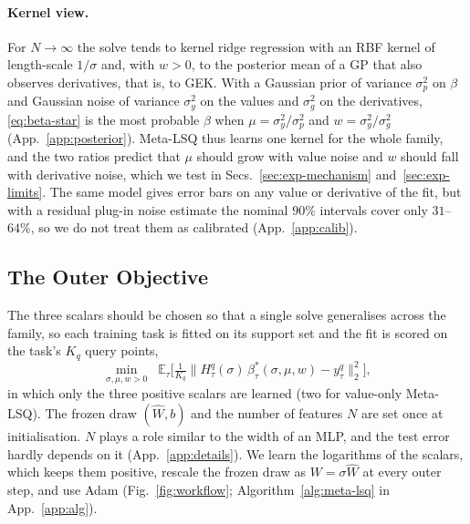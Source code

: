 \documentclass[fullpaper,final]{nldl}
\newcommand{\E}{\mathbb{E}}
\theoremstyle{plain}
\theoremstyle{definition}
\begin{document}
\paragraph{Kernel view.}
\label{sec:dictionary}
For $N\to\infty$ the solve tends to kernel ridge regression with an RBF kernel of
length-scale $1/\sigma$ and, with $w>0$, to the posterior mean of a GP that also
observes derivatives, that is, to GEK. With a Gaussian prior of variance $\sigma_p^2$ on
$\beta$ and Gaussian noise of variance $\sigma_y^2$ on the values and $\sigma_g^2$
on the derivatives, \eqref{eq:beta-star} is the most probable $\beta$ when $\mu =
\sigma_y^2/\sigma_p^2$ and $w = \sigma_y^2/\sigma_g^2$ (App.~\ref{app:posterior}).
Meta-LSQ thus learns one kernel for the whole family, and the two ratios predict
that $\mu$ should grow with value noise and $w$ should fall with derivative noise,
which we test in Secs.~\ref{sec:exp-mechanism} and~\ref{sec:exp-limits}. The same
model gives error bars on any value or derivative of the fit, but with a residual
plug-in noise estimate the nominal $90\%$ intervals cover only $31$--$64\%$, so we
do not treat them as calibrated (App.~\ref{app:calib}).

\subsection{The Outer Objective}
\label{sec:outer-loop}

The three scalars should be chosen so that a single solve generalises across the
family, so each training task is fitted on its support set and the fit is scored
on the task's $K_q$ query points,
\begin{equation}
\label{eq:meta-objective}
\min_{\sigma,\mu,w > 0}\;\;
\E_{\tau}\big[\tfrac{1}{K_q}\|H^q_\tau(\sigma)\,\beta^\ast_\tau(\sigma,\mu,w) - y^q_\tau\|_2^2\big],
\end{equation}
in which only the three positive scalars are learned (two for value-only
Meta-LSQ). The frozen draw $(\hat W, b)$ and the number of
features $N$ are set once at initialisation. $N$ plays a role similar to the width
of an MLP, and the test error hardly depends on it (App.~\ref{app:details}). We learn the logarithms of the scalars, which keeps
them positive, rescale the frozen draw as $W = \sigma\hat W$ at every outer step,
and use Adam (Fig.~\ref{fig:workflow}; Algorithm~\ref{alg:meta-lsq} in
App.~\ref{app:alg}).
\end{document}
